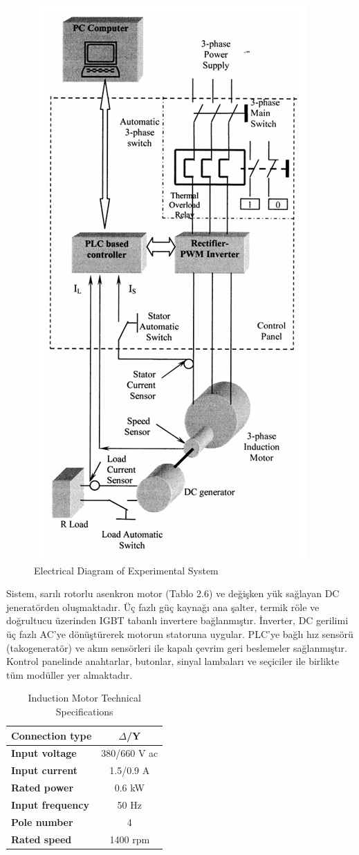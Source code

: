 \begin{figure}[H]
    \centering
    \includegraphics[width=0.4\columnwidth]{imgs/Electrical diagram of experimental system.png}
    \caption[Short description for list of figures]{Electrical Diagram of Experimental System }
    \label{fig-magnitude}
    \end{figure}%

Sistem, sarılı rotorlu asenkron motor (Tablo 2.6) ve değişken yük sağlayan DC jeneratörden oluşmaktadır. Üç fazlı güç kaynağı ana şalter, termik röle ve doğrultucu üzerinden IGBT tabanlı invertere bağlanmıştır. İnverter, DC gerilimi üç fazlı AC’ye dönüştürerek motorun statoruna uygular. PLC’ye bağlı hız sensörü (takogeneratör) ve akım sensörleri ile kapalı çevrim geri beslemeler sağlanmıştır. Kontrol panelinde anahtarlar, butonlar, sinyal lambaları ve seçiciler ile birlikte tüm modüller yer almaktadır.

\begin{table}[h!]
\centering
\label{tab:induction_motor_specs}
\begin{tabular}{|l|c|}
\hline
\textbf{Connection type} & $\Delta$/Y \\ \hline
\textbf{Input voltage} & 380/660 V ac \\ \hline
\textbf{Input current} & 1.5/0.9 A \\ \hline
\textbf{Rated power} & 0.6 kW \\ \hline
\textbf{Input frequency} & 50 Hz \\ \hline
\textbf{Pole number} & 4 \\ \hline
\textbf{Rated speed} & 1400 rpm \\ \hline
\end{tabular}
\caption{Induction Motor Technical Specifications}
\end{table}

